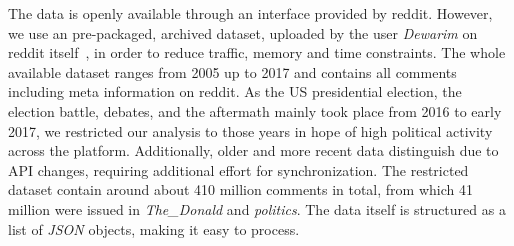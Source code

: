 \documentclass[runningheads,a4paper]{llncs}
\begin{document}
	The data is openly available through an interface provided by reddit. However, we use an pre-packaged, archived dataset, uploaded by the user \textit{Dewarim} on reddit itself~\cite{dataset-source}, in order to reduce traffic, memory and time constraints. The whole available dataset
	ranges from 2005 up to 2017 and contains all comments including meta information on reddit.
	As the US presidential election, the election battle, debates, and the aftermath mainly took place from 2016 to early 2017, we restricted our analysis to those years in hope of high political activity across the platform. Additionally, older and more recent data distinguish due to API changes, requiring additional effort for synchronization.
	The restricted dataset contain around about 410 million comments in total, from which 41 million were issued in \textit{The\_Donald} and \textit{politics}.
	The data itself is structured as a list of \textit{JSON} objects, making it easy to process.
	
\end{document}
